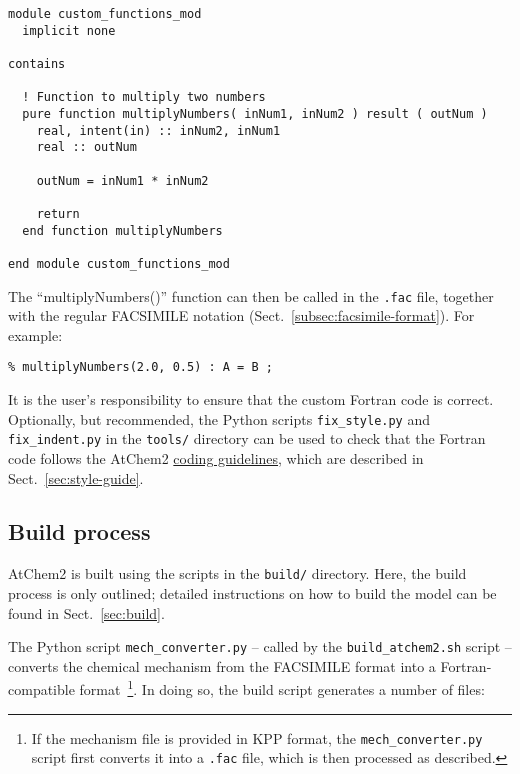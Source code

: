 \begin{verbatim}
module custom_functions_mod
  implicit none

contains

  ! Function to multiply two numbers
  pure function multiplyNumbers( inNum1, inNum2 ) result ( outNum )
    real, intent(in) :: inNum2, inNum1
    real :: outNum

    outNum = inNum1 * inNum2

    return
  end function multiplyNumbers

end module custom_functions_mod
\end{verbatim}

The ``multiplyNumbers()'' function can then be called in the
\texttt{.fac} file, together with the regular FACSIMILE notation
(Sect.~\ref{subsec:facsimile-format}). For example:

\begin{verbatim}
% multiplyNumbers(2.0, 0.5) : A = B ;
\end{verbatim}

It is the user's responsibility to ensure that the custom Fortran code
is correct. Optionally, but recommended, the Python scripts
\texttt{fix\_style.py} and \texttt{fix\_indent.py} in the \texttt{tools/}
directory can be used to check that the Fortran code follows the
AtChem2 \hyperref[subsec:style-recommendations]{coding guidelines},
which are described in Sect.~\ref{sec:style-guide}.

\subsection{Build process} \label{subsec:build-process}

AtChem2 is built using the scripts in the \texttt{build/}
directory. Here, the build process is only outlined; detailed
instructions on how to build the model can be found in
Sect.~\ref{sec:build}.

The Python script \texttt{mech\_converter.py} -- called by the
\texttt{build\_atchem2.sh} script -- converts the chemical mechanism
from the FACSIMILE format into a Fortran-compatible
format~\footnote{If the mechanism file is provided in KPP format, the
  \texttt{mech\_converter.py} script first converts it into a
  \texttt{.fac} file, which is then processed as described.}. In doing
so, the build script generates a number of files:

